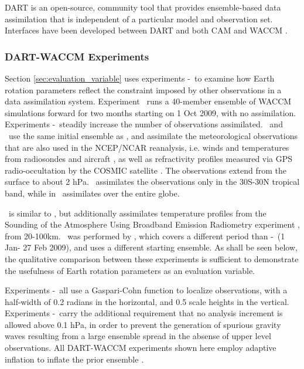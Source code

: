 DART \citep{Anderson2009} is an open-source, community tool that provides ensemble-based data assimilation that is independent of a particular model and observation set.
Interfaces have been developed between DART and both CAM \citep{Raeder2012} and WACCM \citep{Pedatella2013}.

\subsubsection{DART-WACCM Experiments}
Section \ref{sec:evaluation_variable} uses experiments \WACCMNODA-\NCARFULL~to examine how Earth rotation parameters reflect the constraint imposed by other observations in a data assimilation system.  
Experiment \WACCMNODA~runs a 40-member ensemble of WACCM simulations forward for two months starting on 1 Oct 2009, with no assimilation. 
Experiments \WACCMTROPICS-\NCARFULL~steadily increase the number of observations assimilated. 
\WACCMTROPICS~and \WACCMGLOBAL~use the same initial ensemble as \WACCMNODA, and assimilate the meteorological observations that are also used in the NCEP/NCAR reanalysis, i.e. winds and temperatures from radiosondes and aircraft \citep{Saha2010}, as well as refractivity profiles measured via GPS radio-occultation by the COSMIC satellite \citep{Anthes2008}.
The observations extend from the surface to about 2 hPa. 
\WACCMTROPICS~assimilates the observations only in the 30S-30N tropical band, while in \WACCMGLOBAL~assimilates over the entire globe.

\NCARFULL ~is similar to \WACCMGLOBAL, but additionally assimilates temperature profiles from the Sounding of the Atmosphere Using Broadband Emission Radiometry experiment \citep[SABER]{Russell2009}, from 20-100km.
\NCARFULL ~was performed by \citet{Pedatella2014}, which covers a different period than \WACCMNODA-\WACCMTROPICS ~(1 Jan- 27 Feb 2009), and uses a different starting ensemble.  
As shall be seen below, the qualitative comparison between these experiments is sufficient to demonstrate the usefulness of Earth rotation parameters as an evaluation variable. 

Experiments \WACCMNODA-\NCARFULL~all use a Gaspari-Cohn function \citep{Gaspari1999} to localize observations, with a half-width of 0.2 radians in the horizontal, and 0.5 scale heights in the vertical.  
Experiments \WACCMNODA-\WACCMGLOBAL~carry the additional requirement that no analysis increment is allowed above 0.1 hPa, in order to prevent the generation of spurious gravity waves resulting from a large ensemble spread in the absense of upper level observations. 
All DART-WACCM experiments shown here employ adaptive inflation to inflate the prior ensemble \citep{Anderson2009}.  

